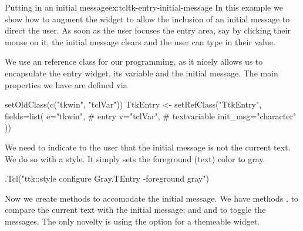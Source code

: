 

\begin{example}{Putting in an initial message}{ex:tcltk-entry-initial-message}
In this example we show how to augment the  widget
to allow the inclusion of an initial message to direct the user. As
soon as the user focuses the entry area, say by clicking their mouse
on it, the initial message clears and the user can type in their
value.

We use an \R{} reference class for our programming, as it nicely
allows us to encapsulate the entry widget, its \TCL{} variable and the
initial message. The main properties we have are defined via


\begin{Schunk}
\begin{Sinput}
 setOldClass(c("tkwin", "tclVar"))
 TtkEntry <- setRefClass("TtkEntry",
                         fields=list(
                           e="tkwin",    # entry
                           v="tclVar",   # textvariable
                           init_msg="character"
                           ))
\end{Sinput}
\end{Schunk}
%

We need to indicate to the user that the initial message is not the
current text. We do so with a style. It simply sets the foreground
(text) color to gray.

\begin{Schunk}
\begin{Sinput}
 .Tcl("ttk::style configure Gray.TEntry -foreground gray") 
\end{Sinput}
\end{Schunk}

%
Now we create methods to accomodate the initial message. We have
methods , to compare the current text with the
initial message; and  and 
to toggle the messages. The only novelty is using the
 option for a themeable widget.
\begin{Schunk}
\end{Schunk}


\end{example}

